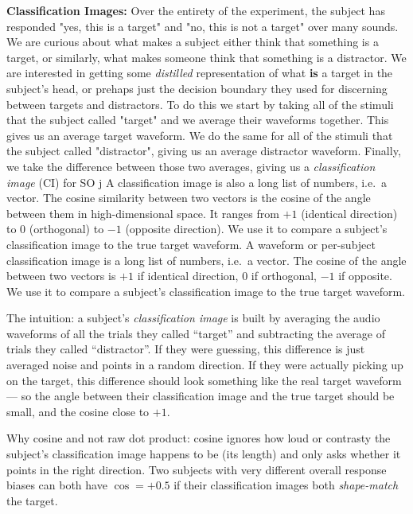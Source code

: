 \documentclass[11pt]{article}
\begin{document}
\textbf{Classification Images:} Over the entirety of the experiment, the subject has responded "yes, this is a target" and "no, this is not a target" over many sounds. 
We are curious about what makes a subject either think that something is a target, or similarly, what makes someone think that something is a distractor.
We are interested in getting some \textit{distilled} representation of what \textbf{is} a target in the subject's head, or prehaps just the decision boundary they used for discerning between targets and distractors.
To do this we start by taking all of the stimuli that the subject called "target" and we average their waveforms together. This gives us an average target waveform. We do the same for all of the stimuli that the subject called "distractor", giving us an average distractor waveform. Finally, we take the difference between those two averages, giving us a \textit{classification image} (CI) for 
SO j
A classification image is also a long list of numbers, i.e.\ a vector. The cosine similarity between two vectors is the cosine of the angle between them in high-dimensional space. It ranges from $+1$ (identical direction) to $0$ (orthogonal) to $-1$ (opposite direction). We use it to compare a subject's classification image to the true target waveform.
A waveform or per-subject classification image is a long list of
numbers, i.e.\ a vector. The cosine of the angle between two vectors is
$+1$ if identical direction, $0$ if orthogonal, $-1$ if opposite. We
use it to compare a subject's classification image to the true target
waveform.

The intuition: a subject's \emph{classification image} is built by
averaging the audio waveforms of all the trials they called ``target''
and subtracting the average of trials they called ``distractor''. If
they were guessing, this difference is just averaged noise and points
in a random direction. If they were actually picking up on the target,
this difference should look something like the real target waveform
--- so the angle between their classification image and the true target
should be small, and the cosine close to $+1$.

Why cosine and not raw dot product: cosine ignores how loud or
contrasty the subject's classification image happens to be (its
length) and only asks whether it points in the right direction. Two
subjects with very different overall response biases can both have
$\cos = +0.5$ if their classification images both \emph{shape-match}
the target.
\end{document}
